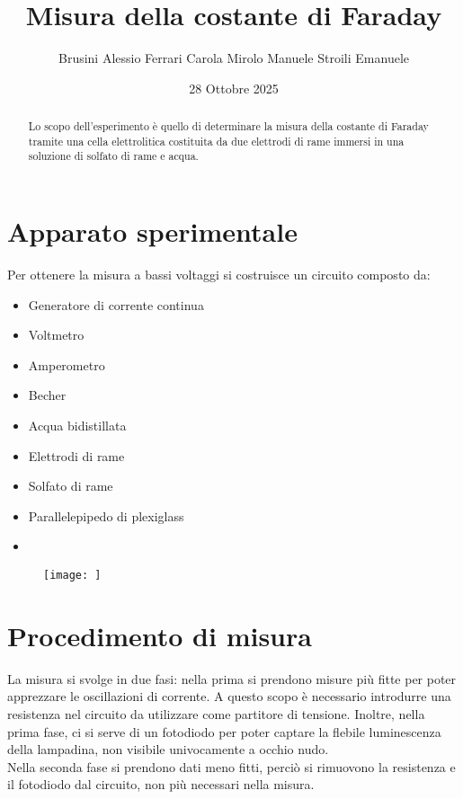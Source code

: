 \documentclass[10pt,twocolumn]{article}
\begin{document}
\justifying
	\title{\textbf{Misura della costante di Faraday}}
	\author{Brusini Alessio \hspace{0.7cm} Ferrari Carola \hspace{0.7cm} Mirolo Manuele \hspace{0.7cm} Stroili Emanuele}
	\date{28 Ottobre 2025}
	\maketitle
	\onecolumn
	\tableofcontents
\vspace{3cm}
	\begin{abstract}
		\centering
		\large
    Lo scopo dell'esperimento è quello di determinare la misura della costante di Faraday tramite una cella elettrolitica costituita da due elettrodi di rame immersi in una soluzione di solfato di rame e acqua.
       
	\end{abstract}

	\newpage
\restoregeometry
\twocolumn

\section{Apparato sperimentale}
Per ottenere la misura a bassi voltaggi si costruisce un circuito composto da:
\begin{itemize}
    \item Generatore di corrente continua
    \item Voltmetro
    \item Amperometro
    \item Becher
    \item Acqua bidistillata
    \item Elettrodi di rame
    \item Solfato di rame
    \item Parallelepipedo di plexiglass
    \item 
\end{itemize}
\begin{figure}[H]
    \centering
    \texttt{[image: ]} %
    \label{fig:I/V_fotodiodo}
\end{figure}
\section{Procedimento di misura}
La misura si svolge in due fasi: nella prima si prendono misure più fitte
per poter apprezzare le oscillazioni di corrente. A questo scopo è necessario
introdurre una resistenza nel circuito da utilizzare come partitore di tensione.
Inoltre, nella prima fase, ci si serve di un fotodiodo per poter captare la 
flebile luminescenza della lampadina, non visibile univocamente a occhio nudo.\\
Nella seconda fase si prendono dati meno fitti, perciò si rimuovono la 
resistenza e il fotodiodo dal circuito, non più necessari nella misura.
\end{document}
